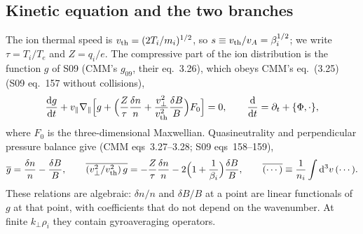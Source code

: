 \subsection{Kinetic equation and the two branches}\label{mod:branches}

The ion thermal speed is $v_{\mathrm{th}}=(2T_i/m_i)^{1/2}$, so $s\equiv v_{\mathrm{th}}/v_A=\beta_i^{1/2}$; we write $\tau=T_i/T_e$ and $Z=q_i/e$. The compressive part of the ion distribution is the function $g$ of S09 (CMM's $g_{09}$, their eq.~3.26), which obeys CMM's eq.~(3.25) (S09 eq.~157 without collisions),
\begin{equation}\label{mod:kinetic}
  \frac{\mathrm{d} g}{\mathrm{d} t}+v_\parallel\nabla_\parallel\Big[g+\Big(\frac{Z}{\tau}\frac{\delta n}{n}+\frac{v_\perp^2}{v_{\mathrm{th}}^2}\frac{\delta B}{B}\Big)F_0\Big]=0,
  \qquad \frac{\mathrm{d}}{\mathrm{d} t}=\partial_t+\{\Phi,\cdot\},
\end{equation}
where $F_0$ is the three-dimensional Maxwellian. Quasineutrality and perpendicular pressure balance give (CMM eqs~3.27--3.28; S09 eqs~158--159),
\begin{equation}\label{mod:fields}
  \overline{g}=\frac{\delta n}{n}-\frac{\delta B}{B},\qquad
  \overline{(v_\perp^2/v_{\mathrm{th}}^2)\,g}=-\frac{Z}{\tau}\frac{\delta n}{n}-2\Big(1+\frac{1}{\beta_i}\Big)\frac{\delta B}{B},
  \qquad \overline{(\cdots)}\equiv\frac{1}{n_i}\int\mathrm{d}^3v\,(\cdots).
\end{equation}
These relations are algebraic: $\delta n/n$ and $\delta B/B$ at a point are linear functionals of $g$ at that point, with coefficients that do not depend on the wavenumber. At finite $k_\perp\rho_i$ they contain gyroaveraging operators.

